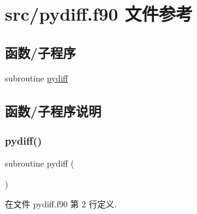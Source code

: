 \hypertarget{pydiff_8f90}{}\section{src/pydiff.f90 文件参考}
\label{pydiff_8f90}
\subsection*{函数/子程序}
\begin{DoxyCompactItemize}
\item 
subroutine \mbox{\hyperlink{pydiff_8f90_a973c4594f689ccebe5ec7cac4d282a3b}{pydiff}}
\end{DoxyCompactItemize}


\subsection{函数/子程序说明}
\mbox{\label{pydiff_8f90_a973c4594f689ccebe5ec7cac4d282a3b}} 
\subsubsection{\texorpdfstring{pydiff()}{pydiff()}}
{\footnotesize\ttfamily subroutine pydiff (\begin{DoxyParamCaption}{ }\end{DoxyParamCaption})}



在文件 pydiff.\+f90 第 2 行定义.

